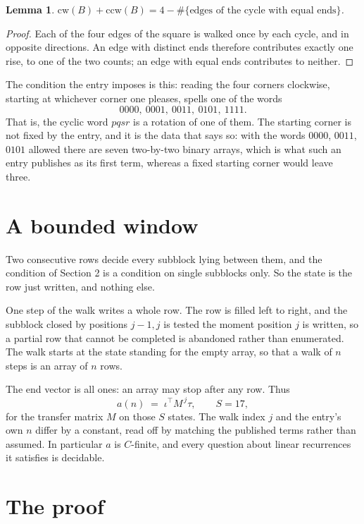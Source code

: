 \documentclass[11pt,a4paper]{article}
\theoremstyle{plain}
\newtheorem{lemma}[theorem]{Lemma}
\theoremstyle{definition}
\begin{document}
\begin{lemma}\label{lem:sum}
$\mathrm{cw}(B)+\mathrm{ccw}(B)=4-\#\{\text{edges of the cycle with equal ends}\}$.
\end{lemma}

\begin{proof}
Each of the four edges of the square is walked once by each cycle, and in opposite directions.
An edge with distinct ends therefore contributes exactly one rise, to one of the two counts;
an edge with equal ends contributes to neither.
\end{proof}

The condition the entry imposes is this: reading the four corners clockwise, starting at whichever corner one pleases, spells one of the words
\[
0000,\ 0001,\ 0011,\ 0101,\ 1111.
\]
That is, the cyclic word $pqsr$ is a rotation of one of them. The starting corner is not fixed by the entry, and it is the data that says so: with the words $0000$, $0011$, $0101$ allowed there are seven two-by-two binary arrays, which is what such an entry publishes as its first term, whereas a fixed starting corner would leave three.

\section{A bounded window}

Two consecutive rows decide every subblock lying between them, and the condition of Section 2 is a condition on single subblocks only. So the state is the row just written, and nothing else.

One step of the walk writes a whole row. The row is filled left to right, and the subblock
closed by positions $j-1,j$ is tested the moment position $j$ is written, so a partial row that
cannot be completed is abandoned rather than enumerated. The walk starts at the state standing
for the empty array, so that a walk of $n$ steps is an array of $n$ rows.

The end vector is all ones: an array may stop after any row. Thus
\[
a(n)\;=\;\iota^{\!\top}M^{\,j}\tau ,\qquad S=17,
\]
for the transfer matrix $M$ on those $S$ states. The walk index $j$ and the entry's own $n$
differ by a constant, read off by matching the published terms rather than assumed. In
particular $a$ is $C$-finite, and every question about linear recurrences it satisfies is
decidable.

\section{The proof}
\end{document}
